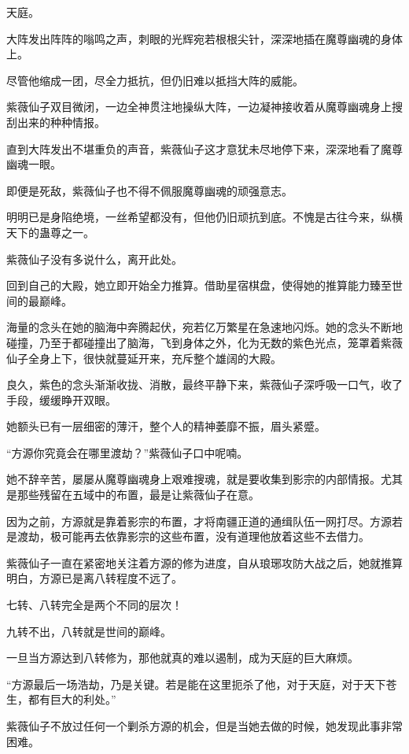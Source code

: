 
\begin{this_body}

天庭。

大阵发出阵阵的嗡鸣之声，刺眼的光辉宛若根根尖针，深深地插在魔尊幽魂的身体上。

尽管他缩成一团，尽全力抵抗，但仍旧难以抵挡大阵的威能。

紫薇仙子双目微闭，一边全神贯注地操纵大阵，一边凝神接收着从魔尊幽魂身上搜刮出来的种种情报。

直到大阵发出不堪重负的声音，紫薇仙子这才意犹未尽地停下来，深深地看了魔尊幽魂一眼。

即便是死敌，紫薇仙子也不得不佩服魔尊幽魂的顽强意志。

明明已是身陷绝境，一丝希望都没有，但他仍旧顽抗到底。不愧是古往今来，纵横天下的蛊尊之一。

紫薇仙子没有多说什么，离开此处。

回到自己的大殿，她立即开始全力推算。借助星宿棋盘，使得她的推算能力臻至世间的最巅峰。

海量的念头在她的脑海中奔腾起伏，宛若亿万繁星在急速地闪烁。她的念头不断地碰撞，乃至于都碰撞出了脑海，飞到身体之外，化为无数的紫色光点，笼罩着紫薇仙子全身上下，很快就蔓延开来，充斥整个雄阔的大殿。

良久，紫色的念头渐渐收拢、消散，最终平静下来，紫薇仙子深呼吸一口气，收了手段，缓缓睁开双眼。

她额头已有一层细密的薄汗，整个人的精神萎靡不振，眉头紧蹙。

“方源你究竟会在哪里渡劫？”紫薇仙子口中呢喃。

她不辞辛苦，屡屡从魔尊幽魂身上艰难搜魂，就是要收集到影宗的内部情报。尤其是那些残留在五域中的布置，最是让紫薇仙子在意。

因为之前，方源就是靠着影宗的布置，才将南疆正道的通缉队伍一网打尽。方源若是渡劫，极可能再去依靠影宗的这些布置，没有道理他放着这些不去借力。

紫薇仙子一直在紧密地关注着方源的修为进度，自从琅琊攻防大战之后，她就推算明白，方源已是离八转程度不远了。

七转、八转完全是两个不同的层次！

九转不出，八转就是世间的巅峰。

一旦当方源达到八转修为，那他就真的难以遏制，成为天庭的巨大麻烦。

“方源最后一场浩劫，乃是关键。若是能在这里扼杀了他，对于天庭，对于天下苍生，都有巨大的利处。”

紫薇仙子不放过任何一个剿杀方源的机会，但是当她去做的时候，她发现此事非常困难。


\end{this_body}
